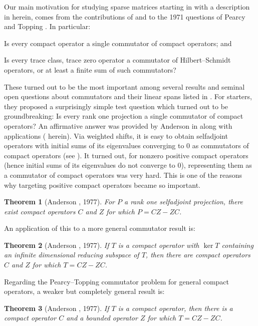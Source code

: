 \documentclass[10pt,reqno]{amsart}
\newtheorem{theorem}{Theorem}[section]
\theoremstyle{remark}
\numberwithin{equation}{section}
\begin{document}
Our main motivation for studying sparse matrices starting in \cite{PPW-2020-TmloVLOt} with a description in  herein, comes from the contributions of \cite{And-1977-JRAM} and \cite{Wei-1980-IEOT} to the 1971 questions of Pearcy and Topping \cite{PT-1971-MMJ}.
In particular:
\begin{enumerate*}
\item Is every compact operator a single commutator of compact operators; and 
\item Is every trace class, trace zero operator a commutator of Hilbert--Schmidt operators, or at least a finite sum of such commutators?
\end{enumerate*}
These turned out to be the most important among several results and seminal open questions about commutators and their linear spans listed in \cite{PT-1971-MMJ}.
For starters, they proposed a surprisingly simple test question which turned out to be groundbreaking: Is every rank one projection a single commutator of compact operators?
An affirmative answer was provided by Anderson in \cite{And-1977-JRAM} along with applications ( herein).
Via weighted shifts, it is easy to obtain selfadjoint operators with initial sums of its eigenvalues converging to $0$ as commutators of compact operators (see \cite[Theorem~1]{FF-1980-PAMS}).
It turned out, for nonzero positive compact operators (hence initial sums of its eigenvalues do not converge to $0$), representing them as a commutator of compact operators was very hard.
This is one of the reasons why targeting positive compact operators became so important.



\begin{theorem}[Anderson \cite{And-1977-JRAM}, 1977]
  \label{t3}
  For $P$ a rank one selfadjoint projection, there exist compact operators $C$ and $Z$ for which $P=CZ-ZC$.
\end{theorem}



An application of this to a more general commutator result is:
\begin{theorem}[Anderson \cite{And-1977-JRAM}, 1977]
  \label{t4}
  If $T$ is a compact operator with $\ker T$ containing an infinite dimensional reducing subspace of $T$, then there are compact operators $C$ and $Z$ for which $T= CZ-ZC$.
\end{theorem}
Regarding the Pearcy--Topping commutator problem for general compact operators, a weaker but completely general result is:
\begin{theorem}[Anderson \cite{And-1977-JRAM}, 1977]
  \label{t5}
  If $T$ is a compact operator, then there is a compact operator $C$ and a bounded operator $Z$ for which  $T= CZ-ZC$.
\end{theorem}
\end{document}
